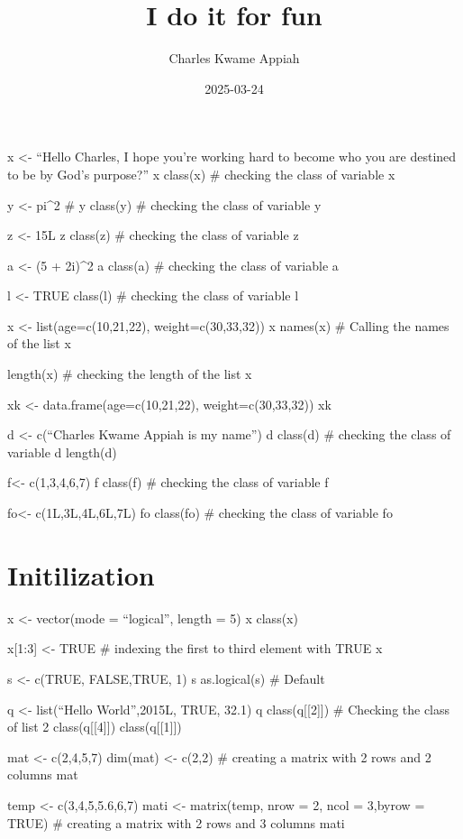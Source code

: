 \documentclass[
]{article}
\title{I do it for fun}
\author{Charles Kwame Appiah}
\date{2025-03-24}
\begin{document}
\maketitle

x \textless- ``Hello Charles, I hope you're working hard to become who
you are destined to be by God's purpose?'' x class(x) \# checking the
class of variable x

y \textless- pi\^{}2 \# y class(y) \# checking the class of variable y

z \textless- 15L z class(z) \# checking the class of variable z

a \textless- (5 + 2i)\^{}2 a class(a) \# checking the class of variable
a

l \textless- TRUE class(l) \# checking the class of variable l

x \textless- list(age=c(10,21,22), weight=c(30,33,32)) x names(x) \#
Calling the names of the list x

length(x) \# checking the length of the list x

xk \textless- data.frame(age=c(10,21,22), weight=c(30,33,32)) xk

d \textless- c(``Charles Kwame Appiah is my name'') d class(d) \#
checking the class of variable d length(d)

f\textless- c(1,3,4,6,7) f class(f) \# checking the class of variable f

fo\textless- c(1L,3L,4L,6L,7L) fo class(fo) \# checking the class of
variable fo

\section{Initilization}\label{initilization}

x \textless- vector(mode = ``logical'', length = 5) x class(x)

x{[}1:3{]} \textless- TRUE \# indexing the first to third element with
TRUE x

s \textless- c(TRUE, FALSE,TRUE, 1) s as.logical(s) \# Default

q \textless- list(``Hello World'',2015L, TRUE, 32.1) q
class(q{[}{[}2{]}{]}) \# Checking the class of list 2
class(q{[}{[}4{]}{]}) class(q{[}{[}1{]}{]})

mat \textless- c(2,4,5,7) dim(mat) \textless- c(2,2) \# creating a
matrix with 2 rows and 2 columns mat

temp \textless- c(3,4,5,5.6,6,7) mati \textless- matrix(temp, nrow = 2,
ncol = 3,byrow = TRUE) \# creating a matrix with 2 rows and 3 columns
mati
\end{document}
